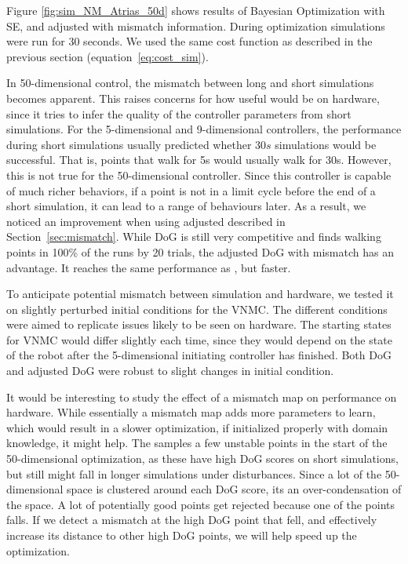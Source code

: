 Figure \ref{fig:sim_NM_Atrias_50d} shows results of Bayesian Optimization with SE, \dogkernel and adjusted \dogkernel with mismatch information. During optimization simulations were run for $30$ seconds. We used the same cost function as described in the previous section (equation~\ref{eq:cost_sim}).

In 50-dimensional control, the mismatch between long and short simulations becomes apparent. This raises concerns for how useful \dogkernel would be on hardware, since it tries to infer the quality of the controller parameters from short simulations. 
For the 5-dimensional and 9-dimensional controllers, the performance during short simulations usually predicted whether $30s$ simulations would be successful. That is, points that walk for 5s would usually walk for 30s. However, this is not true for the 50-dimensional controller. Since this controller is capable of much richer behaviors, if a point is not in a limit cycle before the end of a short simulation, it can lead to a range of behaviours later. As a result, we noticed an improvement when using adjusted \dogkernel described in Section~\ref{sec:mismatch}. While DoG is still very competitive and finds walking points in 100\% of the runs by 20 trials, the adjusted DoG with mismatch has an advantage. It reaches the same performance as \dogkernel, but faster. 

To anticipate potential mismatch between simulation and hardware, we tested it on slightly perturbed initial conditions for the VNMC. The different conditions were aimed to replicate issues likely to be seen on hardware. The starting states for VNMC would differ slightly each time, since they would depend on the state of the robot after the 5-dimensional initiating controller has finished. Both DoG and adjusted DoG were robust to slight changes in initial condition. 

It would be interesting to study the effect of a mismatch map on performance on hardware. While essentially a mismatch map adds more parameters to learn, which would result in a slower optimization, if initialized properly with domain knowledge, it might help. The \dogkernel samples a few unstable points in the start of the 50-dimensional optimization, as these have high DoG scores on short simulations, but still might fall in longer simulations under disturbances. Since a lot of the 50-dimensional space is clustered around each DoG score, its an over-condensation of the space. A lot of potentially good points get rejected because one of the points falls. If we detect a mismatch at the high DoG point that fell, and effectively increase its distance to other high DoG points, we will help speed up the optimization.

